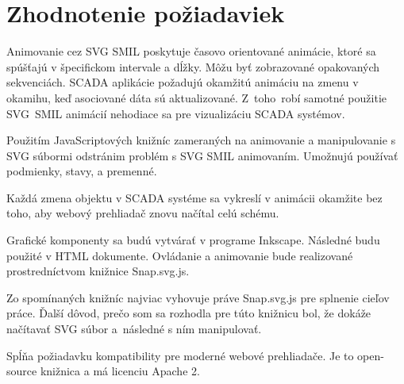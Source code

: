 
%
% 




\section{Zhodnotenie požiadaviek}

Animovanie cez SVG \acs{SMIL} poskytuje  časovo orientované animácie, ktoré sa spúšťajú v špecifickom intervale a dĺžky. Môžu byť  zobrazované opakovaných sekvenciách. 
SCADA aplikácie požadujú okamžitú animáciu na zmenu v okamihu, keď  asociované dáta sú aktualizované. Z~toho~robí samotné použitie SVG~SMIL animácií nehodiace sa pre vizualizáciu SCADA systémov. 

Použitím JavaScriptových knižníc zameraných na animovanie a manipulovanie s SVG súbormi odstránim problém s SVG SMIL animovaním. Umožnujú používať podmienky, stavy, a premenné. 

Každá zmena objektu v SCADA systéme sa vykreslí v animácii okamžite bez toho, aby webový prehliadač znovu načítal celú schému. 

Grafické komponenty sa budú vytvárať v programe Inkscape. Následné budu použité v HTML dokumente. Ovládanie a animovanie bude realizované prostredníctvom knižnice Snap.svg.js. 

Zo spomínaných knižníc najviac vyhovuje práve Snap.svg.js pre splnenie cieľov práce.
Ďalší dôvod, prečo som sa rozhodla pre túto  knižnicu bol, že dokáže načítavať SVG súbor a~následné s ním manipulovať.
 
Spĺňa požiadavku kompatibility pre moderné webové prehliadače. Je to open-source knižnica a má licenciu Apache 2.

